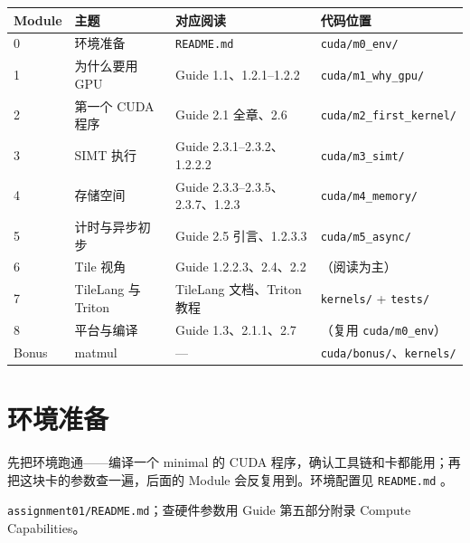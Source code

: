 \documentclass[11pt,a4paper,fontset=none]{ctexart}
\begin{document}
\begin{center}\small
  \begin{tabular}{@{}llll@{}}
    \toprule
    Module & 主题                & 对应阅读                           & 代码位置                                   \\
    \midrule
    0      & 环境准备              & \texttt{README.md}             & \texttt{cuda/m0\_env/}                 \\
    1      & 为什么要用 GPU         & Guide 1.1、1.2.1--1.2.2         & \texttt{cuda/m1\_why\_gpu/}            \\
    2      & 第一个 CUDA 程序       & Guide 2.1 全章、2.6               & \texttt{cuda/m2\_first\_kernel/}       \\
    3      & SIMT 执行           & Guide 2.3.1--2.3.2、1.2.2.2     & \texttt{cuda/m3\_simt/}                \\
    4      & 存储空间              & Guide 2.3.3--2.3.5、2.3.7、1.2.3 & \texttt{cuda/m4\_memory/}              \\
    5      & 计时与异步初步           & Guide 2.5 引言、1.2.3.3           & \texttt{cuda/m5\_async/}               \\
    6      & Tile 视角           & Guide 1.2.2.3、2.4、2.2          & （阅读为主）                                 \\
    7      & TileLang 与 Triton & TileLang 文档、Triton 教程          & \texttt{kernels/} + \texttt{tests/}    \\
    8      & 平台与编译             & Guide 1.3、2.1.1、2.7            & （复用 \texttt{cuda/m0\_env}）             \\
    Bonus  & matmul            & —                              & \texttt{cuda/bonus/}、\texttt{kernels/} \\
    \bottomrule
  \end{tabular}
\end{center}

\setcounter{section}{-1}

\section{环境准备}

先把环境跑通——编译一个 minimal 的 CUDA 程序，确认工具链和卡都能用；再把这块卡的参数查一遍，后面的 Module 会反复用到。环境配置见 \texttt{README.md} 。

\begin{reading}
  \texttt{assignment01/README.md}；查硬件参数用 Guide 第五部分附录 Compute Capabilities。
\end{reading}
\end{document}
